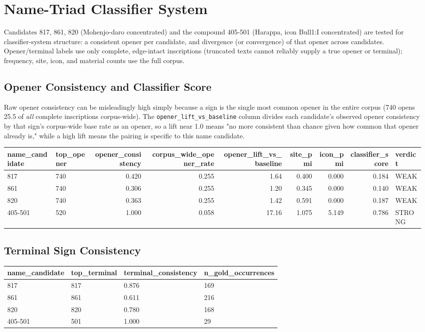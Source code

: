 \section{Name-Triad Classifier System}

Candidates 817, 861, 820 (Mohenjo-daro concentrated) and the compound
405-501 (Harappa, icon Bull1:I concentrated) are tested for classifier-system
structure: a consistent opener per candidate, and divergence (or
convergence) of that opener across candidates. Opener/terminal labels use
only complete, edge-intact inscriptions (truncated texts cannot reliably
supply a true opener or terminal); frequency, site, icon, and material
counts use the full corpus.

\subsection{Opener Consistency and Classifier Score}
Raw opener consistency can be misleadingly high simply because a sign is
the single most common opener in the entire corpus (740 opens 25.5%
of \emph{all} complete inscriptions corpus-wide). The \texttt{opener\_lift\_vs\_baseline}
column divides each candidate's observed opener consistency by that
sign's corpus-wide base rate as an opener, so a lift near 1.0 means "no more
consistent than chance given how common that opener already is," while a
high lift means the pairing is specific to this name candidate.
\begin{tabular}{llrrrrrrl}
\toprule
\textbf{name\_candidate} & \textbf{top\_opener} & \textbf{opener\_consistency} & \textbf{corpus\_wide\_opener\_rate} & \textbf{opener\_lift\_vs\_baseline} & \textbf{site\_pmi} & \textbf{icon\_pmi} & \textbf{classifier\_score} & \textbf{verdict} \\
\midrule
817 & 740 & 0.420 & 0.255 & 1.64 & 0.400 & 0.000 & 0.184 & WEAK \\
861 & 740 & 0.306 & 0.255 & 1.20 & 0.345 & 0.000 & 0.140 & WEAK \\
820 & 740 & 0.363 & 0.255 & 1.42 & 0.591 & 0.000 & 0.187 & WEAK \\
405-501 & 520 & 1.000 & 0.058 & 17.16 & 1.075 & 5.149 & 0.786 & STRONG \\
\bottomrule
\end{tabular}

\subsection{Terminal Sign Consistency}
\begin{tabular}{llll}
\toprule
\textbf{name\_candidate} & \textbf{top\_terminal} & \textbf{terminal\_consistency} & \textbf{n\_gold\_occurrences} \\
\midrule
817 & 817 & 0.876 & 169 \\
861 & 861 & 0.611 & 216 \\
820 & 820 & 0.780 & 168 \\
405-501 & 501 & 1.000 & 29 \\
\bottomrule
\end{tabular}

